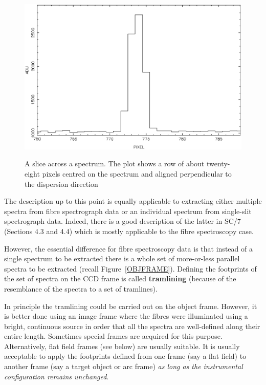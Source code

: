 \documentclass[twoside,11pt]{article}
\newcommand{\xref}[3]{#1}
\begin{document}
\pagebreak
\begin{figure}[htbp]
   \centering 
   \includegraphics[totalheight=4in]{sc14_spslice.ps}
   \begin{quote}
   \caption[A slice across a spectrum]{A slice across a spectrum.
    The plot shows a row of about twenty-eight pixels centred on
    the spectrum and aligned perpendicular to the dispersion
    direction
   \label{SPSLICE} }
   \end{quote}
\end{figure}

The description up to this point is equally applicable to extracting
either multiple spectra from fibre spectrograph data or an individual
spectrum from single-slit spectrograph data.  Indeed, there is a good
description of the latter in SC/7 (Sections
\xref{4.3}{sc7}{selecting_channels} and \xref{4.4}{sc7}{tracing}) which
is mostly applicable to the fibre spectroscopy case.

However, the essential difference for fibre spectroscopy data is that
instead of a single spectrum to be extracted there is a whole set of
more-or-less parallel spectra to be extracted (recall
Figure~\ref{OBJFRAME}).  Defining the footprints of the set of spectra
on the CCD frame is called {\bf tramlining} (because of the resemblance
of the spectra to a set of tramlines).

In principle the tramlining could be carried out on the object
frame.  However, it is better done using an image frame where the
fibres were illuminated using a bright, continuous source in order that
all the spectra are well-defined along their entire length.  Sometimes
special frames are acquired for this purpose.  Alternatively, flat
field frames (see below) are usually suitable.  It is usually
acceptable to apply the footprints defined from one frame (say a flat
field) to another frame (say a target object or arc frame) {\it as long
as the instrumental configuration remains unchanged}.
\end{document}
